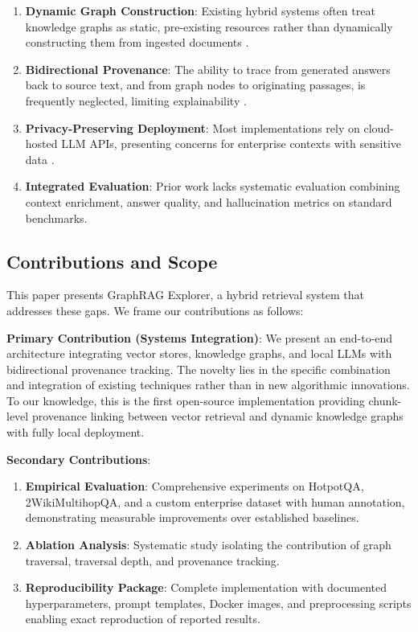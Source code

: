 \documentclass[conference]{IEEEtran}
\begin{document}
\begin{enumerate}
    \item \textbf{Dynamic Graph Construction}: Existing hybrid systems often treat knowledge graphs as static, pre-existing resources rather than dynamically constructing them from ingested documents \cite{yasunaga2021qa}.
    
    \item \textbf{Bidirectional Provenance}: The ability to trace from generated answers back to source text, and from graph nodes to originating passages, is frequently neglected, limiting explainability \cite{yao2023react}.
    
    \item \textbf{Privacy-Preserving Deployment}: Most implementations rely on cloud-hosted LLM APIs, presenting concerns for enterprise contexts with sensitive data \cite{carlini2021extracting}.
    
    \item \textbf{Integrated Evaluation}: Prior work lacks systematic evaluation combining context enrichment, answer quality, and hallucination metrics on standard benchmarks.
\end{enumerate}

\subsection{Contributions and Scope}

This paper presents GraphRAG Explorer, a hybrid retrieval system that addresses these gaps. We frame our contributions as follows:

\textbf{Primary Contribution (Systems Integration)}: We present an end-to-end architecture integrating vector stores, knowledge graphs, and local LLMs with bidirectional provenance tracking. The novelty lies in the specific combination and integration of existing techniques rather than in new algorithmic innovations. To our knowledge, this is the first open-source implementation providing chunk-level provenance linking between vector retrieval and dynamic knowledge graphs with fully local deployment.

\textbf{Secondary Contributions}:

\begin{enumerate}
    \item \textbf{Empirical Evaluation}: Comprehensive experiments on HotpotQA, 2WikiMultihopQA, and a custom enterprise dataset with human annotation, demonstrating measurable improvements over established baselines.
    
    \item \textbf{Ablation Analysis}: Systematic study isolating the contribution of graph traversal, traversal depth, and provenance tracking.
    
    \item \textbf{Reproducibility Package}: Complete implementation with documented hyperparameters, prompt templates, Docker images, and preprocessing scripts enabling exact reproduction of reported results.
\end{enumerate}
\end{document}
